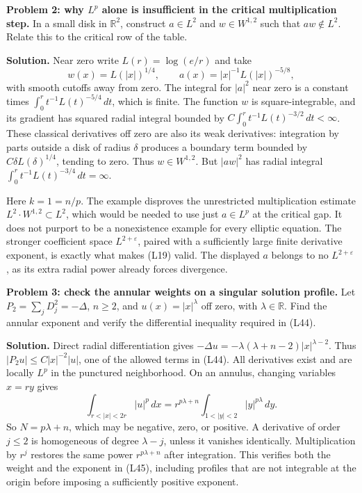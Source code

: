 \documentclass[
  11pt,
]{article}
\newcounter{none} %
\begin{document}
\textbf{Problem 2: why \(L^p\) alone is insufficient in the critical
multiplication step.} In a small disk in \(\mathbb R^2\), construct
\(a\in L^2\) and \(w\in W^{1,2}\) such that \(aw\notin L^2\). Relate
this to the critical row of the table.

\textbf{Solution.} Near zero write \(L(r)=\log(e/r)\) and take \[
w(x)=L(|x|)^{1/4},\qquad
a(x)=|x|^{-1}L(|x|)^{-5/8},
\] with smooth cutoffs away from zero. The integral for \(|a|^2\) near
zero is a constant times \(\int_0^r t^{-1}L(t)^{-5/4}\,dt\), which is
finite. The function \(w\) is square-integrable, and its gradient has
squared radial integral bounded by
\(C\int_0^r t^{-1}L(t)^{-3/2}\,dt<\infty\). These classical derivatives
off zero are also its weak derivatives: integration by parts outside a
disk of radius \(\delta\) produces a boundary term bounded by
\(C\delta L(\delta)^{1/4}\), tending to zero. Thus \(w\in W^{1,2}\). But
\(|aw|^2\) has radial integral
\(\int_0^r t^{-1}L(t)^{-3/4}\,dt=\infty\).

Here \(k=1=n/p\). The example disproves the unrestricted multiplication
estimate \(L^2\cdot W^{1,2}\subset L^2\), which would be needed to use
just \(a\in L^p\) at the critical gap. It does not purport to be a
nonexistence example for every elliptic equation. The stronger
coefficient space \(L^{2+\varepsilon}\), paired with a sufficiently
large finite derivative exponent, is exactly what makes (L19) valid. The
displayed \(a\) belongs to no \(L^{2+\varepsilon}\), as its extra radial
power already forces divergence.

\textbf{Problem 3: check the annular weights on a singular solution
profile.} Let \(P_2=\sum_jD_j^2=-\Delta\), \(n\geq2\), and
\(u(x)=|x|^\lambda\) off zero, with \(\lambda\in\mathbb R\). Find the
annular exponent and verify the differential inequality required in
(L44).

\textbf{Solution.} Direct radial differentiation gives
\(-\Delta u=-\lambda(\lambda+n-2)|x|^{\lambda-2}\). Thus
\(|P_2u|\leq C|x|^{-2}|u|\), one of the allowed terms in (L44). All
derivatives exist and are locally \(L^p\) in the punctured neighborhood.
On an annulus, changing variables \(x=ry\) gives \[
\int_{r<|x|<2r}|u|^p\,dx
=r^{p\lambda+n}\int_{1<|y|<2}|y|^{p\lambda}\,dy.
\] So \(N=p\lambda+n\), which may be negative, zero, or positive. A
derivative of order \(j\leq2\) is homogeneous of degree \(\lambda-j\),
unless it vanishes identically. Multiplication by \(r^j\) restores the
same power \(r^{p\lambda+n}\) after integration. This verifies both the
weight and the exponent in (L45), including profiles that are not
integrable at the origin before imposing a sufficiently positive
exponent.
\end{document}
